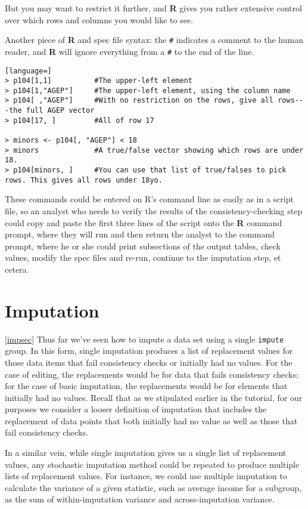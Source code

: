 \documentclass{article}
\begin{document}
But you may want to restrict it further, and \textbf{R} gives you rather extensive control over
which rows and columns you would like to see.

Another piece of \textbf{R} and spec file syntax: the {\tt \#} indicates a comment to the human
reader, and \textbf{R} will ignore everything from a {\tt \#} to the end of the line.

\begin{lstlisting}[language=]
> p104[1,1]          #The upper-left element
> p104[1,"AGEP"]     #The upper-left element, using the column name
> p104[ ,"AGEP"]     #With no restriction on the rows, give all rows---the full AGEP vector
> p104[17, ]         #All of row 17

> minors <- p104[, "AGEP"] < 18
> minors             #A true/false vector showing which rows are under 18.
> p104[minors, ]     #You can use that list of true/falses to pick rows. This gives all rows under 18yo.
\end{lstlisting}

These commands could be entered on R's command line as easily as in a script file, so an
analyst who needs to verify the results of the consistency-checking step could copy and
paste the first three lines of the script onto the \textbf{R} command prompt, where they will run and
then return the analyst to the command prompt, where he or she could print subsections of
the output tables, check values, modify the spec files and re-run, continue to the
imputation step, et cetera.


\section{Imputation}\ref{impsec}
Thus far we've seen how to impute a data set using a single {\tt impute} group. In this form, single 
imputation produces a list of replacement values for those data items that fail consistency checks 
or initially had no values. For the case of editing, the replacements would be for data that fails 
consistency checks; for the case of basic imputation, the replacements would be for elements that
initially had no values. Recall that as we stipulated earlier in the tutorial, for our purposes we 
consider a looser definition of imputation that includes the replacement of data points that both 
initially had no value as well as those that fail consistency checks.

In a similar vein, while single imputation gives us a single list of replacement values, any stochastic 
imputation method could be repeated to produce multiple lists of replacement values. For instance, 
we could use multiple imputation to calculate the variance of a given statistic, such as average 
income for a subgroup, as the sum of within-imputation variance and across-imputation variance.
\end{document}
